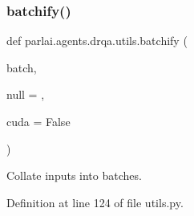 \subsubsection{\texorpdfstring{batchify()}{batchify()}}
{\footnotesize\ttfamily def parlai.\+agents.\+drqa.\+utils.\+batchify (\begin{DoxyParamCaption}\item[{}]{batch,  }\item[{}]{null = {},  }\item[{}]{cuda = {\ttfamily False} }\end{DoxyParamCaption})}

\begin{DoxyVerb}Collate inputs into batches.
\end{DoxyVerb}
 

Definition at line 124 of file utils.\+py.


